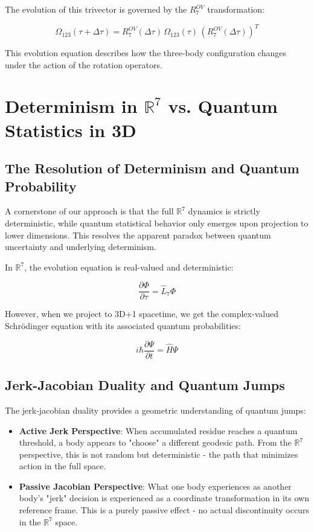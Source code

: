 \documentclass{article}
\begin{document}
The evolution of this trivector is governed by the $R^{OV}_7$ transformation:

\begin{equation}
\Omega_{123}(\tau+\Delta\tau) = R^{OV}_7(\Delta\tau) \, \Omega_{123}(\tau) \, (R^{OV}_7(\Delta\tau))^T
\end{equation}

This evolution equation describes how the three-body configuration changes under the action of the rotation operators.

\section{Determinism in $\mathbb{R}^7$ vs. Quantum Statistics in 3D}

\subsection{The Resolution of Determinism and Quantum Probability}

A cornerstone of our approach is that the full $\mathbb{R}^7$ dynamics is strictly deterministic, while quantum statistical behavior only emerges upon projection to lower dimensions. This resolves the apparent paradox between quantum uncertainty and underlying determinism.

In $\mathbb{R}^7$, the evolution equation is real-valued and deterministic:

\begin{equation}
\frac{\partial \Phi}{\partial \tau} = \hat{L}_7 \Phi
\end{equation}

However, when we project to 3D+1 spacetime, we get the complex-valued Schrödinger equation with its associated quantum probabilities:

\begin{equation}
i\hbar \frac{\partial \Psi}{\partial t} = \hat{H} \Psi
\end{equation}

\subsection{Jerk-Jacobian Duality and Quantum Jumps}

The jerk-jacobian duality provides a geometric understanding of quantum jumps:

\begin{itemize}
\item \textbf{Active Jerk Perspective}: When accumulated residue reaches a quantum threshold, a body appears to "choose" a different geodesic path. From the $\mathbb{R}^7$ perspective, this is not random but deterministic - the path that minimizes action in the full space.

\item \textbf{Passive Jacobian Perspective}: What one body experiences as another body's "jerk" decision is experienced as a coordinate transformation in its own reference frame. This is a purely passive effect - no actual discontinuity occurs in the $\mathbb{R}^7$ space.
\end{itemize}
\end{document}
